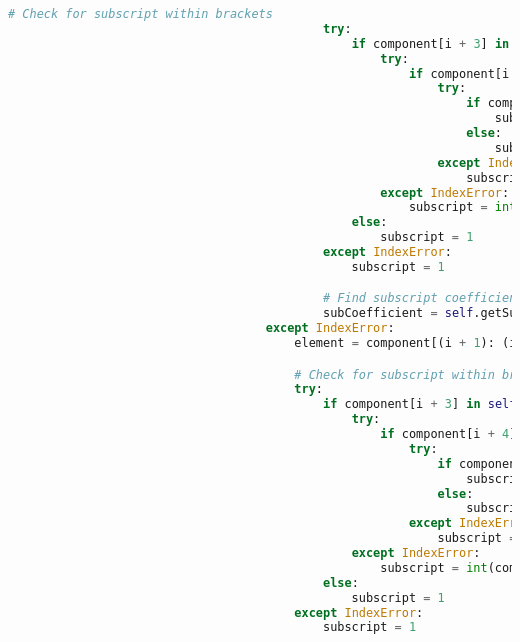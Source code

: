 \documentclass[a4paper,12pt]{article}
\begin{document}
\begin{lstlisting}[language=Python, caption=parseComponent method for finding elements]
                                            # Check for subscript within brackets
                                            try:
                                                if component[i + 3] in self.integers:
                                                    try:
                                                        if component[i + 4] in self.integers:
                                                            try:
                                                                if component[i + 5] in self.integers:
                                                                    subscript = int(component[(i + 3): (i + 6)])
                                                                else:
                                                                    subscript = int(component[(i + 3): (i + 5)])
                                                            except IndexError:
                                                                subscript = int(component[(i + 3): (i + 5)])
                                                    except IndexError:
                                                        subscript = int(component[i + 3])
                                                else:
                                                    subscript = 1
                                            except IndexError:
                                                subscript = 1

                                            # Find subscript coefficient of complex ion
                                            subCoefficient = self.getSubCoefficient(component)
                                    except IndexError:
                                        element = component[(i + 1): (i + 3)]

                                        # Check for subscript within brackets
                                        try:
                                            if component[i + 3] in self.integers:
                                                try:
                                                    if component[i + 4] in self.integers:
                                                        try:
                                                            if component[i + 5] in self.integers:
                                                                subscript = int(component[(i + 3): (i + 6)])
                                                            else:
                                                                subscript = int(component[(i + 3): (i + 5)])
                                                        except IndexError:
                                                            subscript = int(component[(i + 3): (i + 5)])
                                                except IndexError:
                                                    subscript = int(component[i + 3])
                                            else:
                                                subscript = 1
                                        except IndexError:
                                            subscript = 1


\end{lstlisting}
\end{document}
